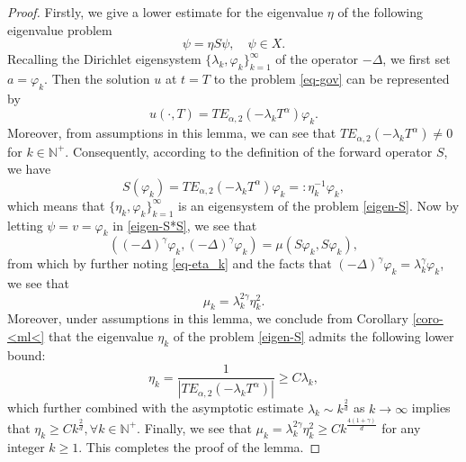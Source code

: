 \documentclass[11pt]{article}
\numberwithin{equation}{section}
\begin{document}
\begin{proof}
Firstly, we give a lower estimate for the eigenvalue $\eta$ of the following eigenvalue problem
\begin{equation}\label{eigen-S}
\psi = \eta S\psi,\quad \psi \in X.
\end{equation}
Recalling the Dirichlet eigensystem $\{\lambda_k, \varphi_k\}_{k=1}^\infty$ of the operator $-\Delta$, we first set $a = \varphi_k$. Then the solution $u$ at $t=T$ to the problem \eqref{eq-gov} can be represented by
$$
u(\cdot,T) = TE_{\alpha,2}(-\lambda_k T^\alpha)\varphi_k.
$$
Moreover, from assumptions in this lemma, we can see that $TE_{\alpha,2}(-\lambda_k T^\alpha)\neq0$ for $k\in\mathbb N^+$. Consequently, according to the definition of the forward operator $S$, we have
\begin{equation}\label{eq-eta_k}
S(\varphi_k) = TE_{\alpha,2}(-\lambda_k T^\alpha)\varphi_k=:\eta_k^{-1} \varphi_k,
\end{equation}
which means that $\{\eta_k, \varphi_k\}_{k=1}^\infty$ is an eigensystem of the problem \eqref{eigen-S}. Now by letting $\psi=v=\varphi_k$ in \eqref{eigen-S*S}, we see that
$$
\left((-\Delta)^{\gamma}\varphi_k, (-\Delta)^{\gamma} \varphi_k  \right) = \mu (S\varphi_k, S\varphi_k),
$$
from which by further noting  \eqref{eq-eta_k} and the facts that $(-\Delta)^{\gamma} \varphi_k = \lambda_k^{\gamma} \varphi_k$, we see that
$$
\mu_k = \lambda_k^{2\gamma} \eta_k^2.
$$
Moreover, under assumptions in this lemma, we conclude from Corollary \ref{coro-<ml<} that the eigenvalue $\eta_k$ of the problem \eqref{eigen-S} admits the following lower bound:
$$
\eta_k = \frac1{|TE_{\alpha,2}(-\lambda_k T^\alpha)|}\ge C\lambda_k,
$$
which further combined with the asymptotic estimate $\lambda_k \sim k^{\frac{2}{d}}$ as $k\to\infty$ implies that $\eta_k \ge Ck^{\frac2d}, \forall k \in \mathbb N^+.
$ Finally, we see that $\mu_k = \lambda_k^{2\gamma} \eta_k^2 \ge Ck^{\frac{4(1+\gamma)}d}$ for any integer $k\ge1$. This completes the proof of the lemma.
\end{proof}
\end{document}
